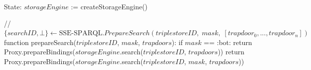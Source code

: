 State:
    $storageEngine$ := createStorageEngine()

// $\{searchID, \bot\} \leftarrow \textrm{SSE-SPARQL}.PrepareSearch(triplestoreID, \; mask, \; [trapdoor_0, ..., trapdoor_n])$ 
function prepareSearch($triplestoreID$, $mask$, $trapdoors$):
    if $mask$ == :bot:
        return Proxy.prepareBindings($storageEngine$.search($triplestoreID$, $trapdoors$))
    return Proxy.prepareBindings($storageEngine$.search($triplestoreID$, $mask$, $trapdoors$)) 